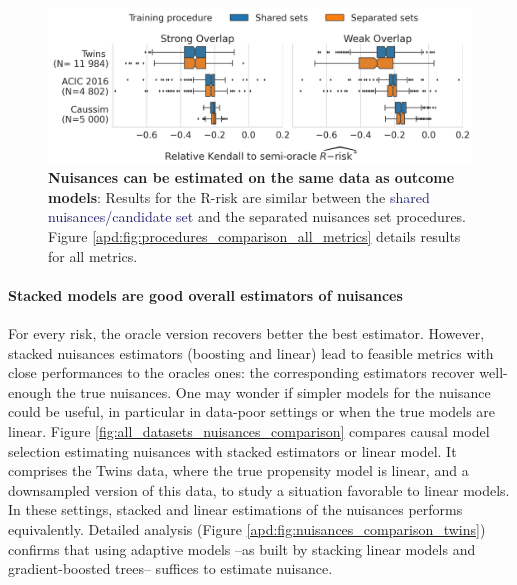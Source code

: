 \documentclass{report}
\begin{document}
\begin{figure}[!tb]
  \includegraphics[width=\linewidth]{img/chapter_5/_3_procedure_r_risk_only_3datasets.png}

  \caption{\textbf{Nuisances can be estimated on the same data as outcome
      models}: Results for the R-risk are similar between the
    \textcolor{MidnightBlue}{shared
      nuisances/candidate set} and
    the \textcolor{RedOrange}{separated nuisances set} procedures. Figure
    \ref{apd:fig:procedures_comparison_all_metrics} details results for all metrics.}\label{fig:procedures_comparison}
\end{figure}


\paragraph{Stacked models are good overall estimators of nuisances}

For every risk, the oracle version recovers better the best estimator.
However,
stacked nuisances estimators (boosting and linear) lead to feasible
metrics with close performances to the oracles ones: the
corresponding estimators recover well-enough the true nuisances.
One may wonder if simpler models for the nuisance could be useful,
in particular in data-poor settings or when the true models are linear.
Figure \ref{fig:all_datasets_nuisances_comparison} compares causal model
selection estimating nuisances with stacked estimators or linear model.
It comprises the Twins data, where the true propensity model is linear,
and a downsampled version of this data, to study a situation favorable to
linear models. In these settings,
stacked and linear estimations of the nuisances performs equivalently.
Detailed analysis (Figure \ref{apd:fig:nuisances_comparison_twins})
confirms that using adaptive models --as built by
stacking linear models and gradient-boosted trees-- suffices to estimate nuisance.
\end{document}
